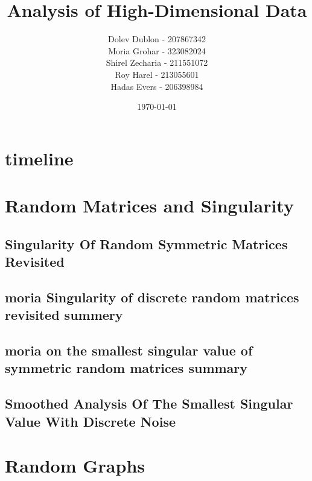 \documentclass[12pt]{article}
\title{\textbf{Analysis of High-Dimensional Data}}
\author{
    Dolev Dublon - 207867342\\
    Moria Grohar - 323082024\\ 
    Shirel Zecharia - 211551072\\
    Roy Harel - 213055601\\
    Hadas Evers - 206398984 
}
\date{\today}
\begin{document}
\maketitle


\tableofcontents

\newpage





\section{timeline}



\section{Random Matrices and Singularity}





\subsection{Singularity Of Random Symmetric Matrices Revisited}



\subsection{moria Singularity of discrete random matrices revisited summery}



\subsection{moria on the smallest singular value of symmetric random matrices summary}



\subsection{Smoothed Analysis Of The Smallest Singular Value With Discrete Noise}



\newpage
\section{Random Graphs}
\end{document}
